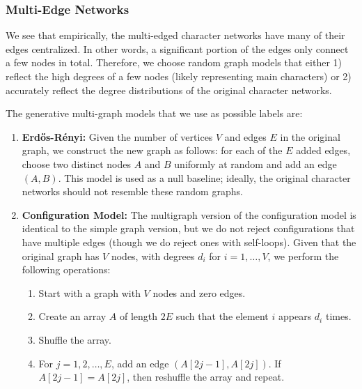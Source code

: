 \documentclass{article} %
\begin{document}
\subsubsection{Multi-Edge Networks}

We see that empirically, the multi-edged character networks have many of their edges centralized. In other words, a significant portion of the edges only connect a few nodes in total. Therefore, we choose random graph models that either 1) reflect the high degrees of a few nodes (likely representing main characters) or 2) accurately reflect the degree distributions of the original character networks. 

The generative multi-graph models that we use as possible labels are:

\begin{enumerate}
    \item \textbf{Erdős-Rényi:} Given the number of vertices \(V\) and edges \(E\) in the original graph, we construct the new graph as follows: for each of the \(E\) added edges, choose two distinct nodes \(A\) and \(B\) uniformly at random and add an edge \((A, B)\). This model is used as a null baseline; ideally, the original character networks should not resemble these random graphs.

    \item \textbf{Configuration Model:} The multigraph version of the configuration model is identical to the simple graph version, but we do not reject configurations that have multiple edges (though we do reject ones with self-loops). Given that the original graph has \(V\) nodes, with degrees \(d_i\) for \(i = 1, \dots, V\), we perform the following operations:
    \begin{enumerate}
        \item Start with a graph with \(V\) nodes and zero edges.
        \item Create an array \(A\) of length \(2E\) such that the element \(i\) appears \(d_i\) times.
        \item Shuffle the array.
        \item For \(j = 1, 2, \dots, E\), add an edge \((A[2j-1], A[2j])\). If \(A[2j-1] = A[2j]\), then reshuffle the array and repeat.
    \end{enumerate}


\end{enumerate}
\end{document}
